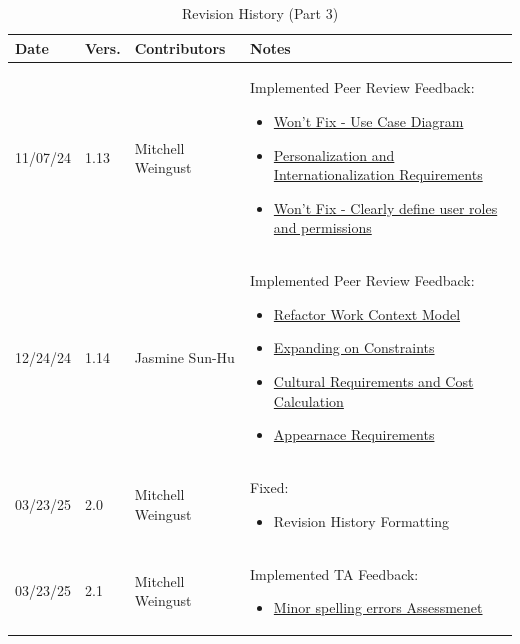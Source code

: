 \documentclass[12pt]{article}
\begin{document}
\begin{table}[H]
  \centering
  \caption{Revision History (Part 3)}
  \label{TblRevisionHistoryPart1}
  \begin{tabularx}{\textwidth}{p{1.5cm} p{1cm} p{3.5cm} X}
      \toprule
      \textbf{Date} & \textbf{Vers.} & \textbf{Contributors} & \textbf{Notes} \\
      \midrule
      11/07/24 & 1.13 & Mitchell Weingust & Implemented Peer Review Feedback:
      \begin{itemize}[leftmargin=*]
        \item \href{https://github.com/parishanizam/TeleHealth/issues/119}{Won't Fix - Use Case Diagram}
        \item \href{https://github.com/parishanizam/TeleHealth/issues/121}{Personalization and Internationalization Requirements}
        \item \href{https://github.com/parishanizam/TeleHealth/issues/123}{Won't Fix - Clearly define user roles and permissions}
      \end{itemize} \\
      12/24/24 & 1.14 & Jasmine Sun-Hu & Implemented Peer Review Feedback:
      \begin{itemize}[leftmargin=*]
        \item \href{https://github.com/parishanizam/TeleHealth/issues/115}{Refactor Work Context Model}
        \item \href{https://github.com/parishanizam/TeleHealth/issues/117}{Expanding on Constraints}
        \item \href{https://github.com/parishanizam/TeleHealth/issues/122}{Cultural Requirements and Cost Calculation}
        \item \href{https://github.com/parishanizam/TeleHealth/issues/124}{Appearnace Requirements}
      \end{itemize} \\
      03/23/25 & 2.0 & Mitchell Weingust & Fixed:
      \begin{itemize}[leftmargin=*]
        \item Revision History Formatting
      \end{itemize} \\
      03/23/25 & 2.1 & Mitchell Weingust & Implemented TA Feedback: 
      \begin{itemize}[leftmargin=*]
        \item \href{https://github.com/parishanizam/TeleHealth/issues/194}{Minor spelling errors Assessmenet}

\end{itemize}
\end{tabularx}
\end{table}
\end{document}
